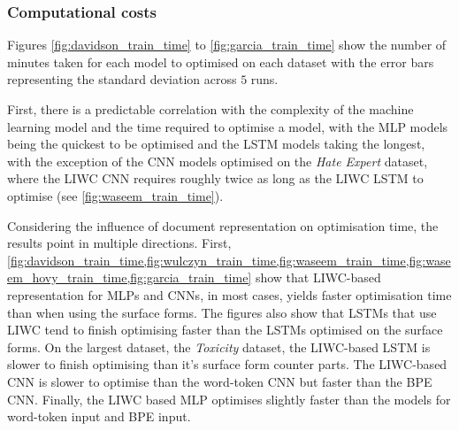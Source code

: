 \subsubsection{Computational costs}

Figures \ref{fig:davidson_train_time} to \ref{fig:garcia_train_time} show the number of minutes taken for each model to optimised on each dataset with the error bars representing the standard deviation across $5$ runs.

First, there is a predictable correlation with the complexity of the machine learning model and the time required to optimise a model, with the MLP models being the quickest to be optimised and the LSTM models taking the longest, with the exception of the CNN models optimised on the \textit{Hate Expert} dataset, where the LIWC CNN requires roughly twice as long as the LIWC LSTM to optimise (see \cref{fig:waseem_train_time}).

Considering the influence of document representation on optimisation time, the results point in multiple directions.
First, \cref{fig:davidson_train_time,fig:wulczyn_train_time,fig:waseem_train_time,fig:waseem_hovy_train_time,fig:garcia_train_time} show that LIWC-based representation for MLPs and CNNs, in most cases, yields faster optimisation time than when using the surface forms.
The figures also show that LSTMs that use LIWC tend to finish optimising faster than the LSTMs optimised on the surface forms.
On the largest dataset, the \textit{Toxicity} dataset, the LIWC-based LSTM is slower to finish optimising than it's surface form counter parts.
The LIWC-based CNN is slower to optimise than the word-token CNN but faster than the BPE CNN.
Finally, the LIWC based MLP optimises slightly faster than the models for word-token input and BPE input.

